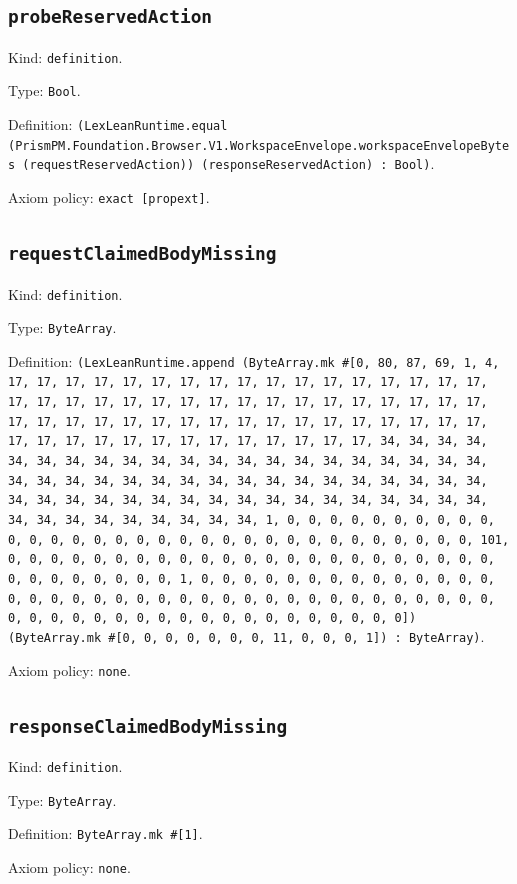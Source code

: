 \documentclass[11pt]{article}
\begin{document}
\subsection*{\texttt{probeReservedAction}}
\noindent Kind: \texttt{definition}.\par
\noindent Type: \texttt{Bool}.\par
\noindent Definition: \texttt{(LexLeanRuntime.equal (PrismPM.Foundation.Browser.V1.WorkspaceEnvelope.workspaceEnvelopeBytes (requestReservedAction)) (responseReservedAction) : Bool)}.\par
\noindent Axiom policy: \texttt{exact [propext]}.\par
\subsection*{\texttt{requestClaimedBodyMissing}}
\noindent Kind: \texttt{definition}.\par
\noindent Type: \texttt{ByteArray}.\par
\noindent Definition: \texttt{(LexLeanRuntime.append (ByteArray.mk \#[0, 80, 87, 69, 1, 4, 17, 17, 17, 17, 17, 17, 17, 17, 17, 17, 17, 17, 17, 17, 17, 17, 17, 17, 17, 17, 17, 17, 17, 17, 17, 17, 17, 17, 17, 17, 17, 17, 17, 17, 17, 17, 17, 17, 17, 17, 17, 17, 17, 17, 17, 17, 17, 17, 17, 17, 17, 17, 17, 17, 17, 17, 17, 17, 17, 17, 17, 17, 17, 17, 34, 34, 34, 34, 34, 34, 34, 34, 34, 34, 34, 34, 34, 34, 34, 34, 34, 34, 34, 34, 34, 34, 34, 34, 34, 34, 34, 34, 34, 34, 34, 34, 34, 34, 34, 34, 34, 34, 34, 34, 34, 34, 34, 34, 34, 34, 34, 34, 34, 34, 34, 34, 34, 34, 34, 34, 34, 34, 34, 34, 34, 34, 34, 34, 1, 0, 0, 0, 0, 0, 0, 0, 0, 0, 0, 0, 0, 0, 0, 0, 0, 0, 0, 0, 0, 0, 0, 0, 0, 0, 0, 0, 0, 0, 0, 0, 0, 101, 0, 0, 0, 0, 0, 0, 0, 0, 0, 0, 0, 0, 0, 0, 0, 0, 0, 0, 0, 0, 0, 0, 0, 0, 0, 0, 0, 0, 0, 0, 0, 1, 0, 0, 0, 0, 0, 0, 0, 0, 0, 0, 0, 0, 0, 0, 0, 0, 0, 0, 0, 0, 0, 0, 0, 0, 0, 0, 0, 0, 0, 0, 0, 0, 0, 0, 0, 0, 0, 0, 0, 0, 0, 0, 0, 0, 0, 0, 0, 0, 0, 0, 0, 0, 0, 0, 0, 0]) (ByteArray.mk \#[0, 0, 0, 0, 0, 0, 0, 11, 0, 0, 0, 1]) : ByteArray)}.\par
\noindent Axiom policy: \texttt{none}.\par
\subsection*{\texttt{responseClaimedBodyMissing}}
\noindent Kind: \texttt{definition}.\par
\noindent Type: \texttt{ByteArray}.\par
\noindent Definition: \texttt{ByteArray.mk \#[1]}.\par
\noindent Axiom policy: \texttt{none}.\par
\end{document}

